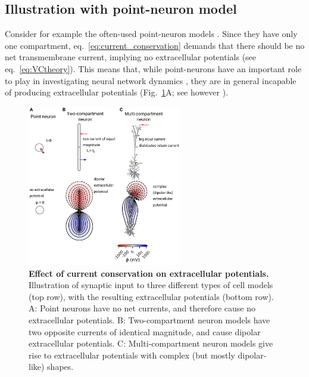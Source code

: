 \documentclass[preprint,11pt,authoryear]{elsarticle}
\begin{document}
\subsection*{Illustration with point-neuron model}
Consider for example the often-used point-neuron models \citep{Sterratt2011}. Since they have only one compartment, eq.~\ref{eq:current_conservation} demands that there should be no net transmembrane current, implying no extracellular potentials (see eq.~\ref{eq:VCtheory}). This means that, while point-neurons have an important role to play in investigating neural network dynamics \citep{Einevoll2019}, they are in general incapable of producing extracellular potentials (Fig.~\ref{fig:current_conservation}A; see however \cite{Mazzoni2015, Hagen2016}). 

\begin{figure}[h!]
\begin{center}
\includegraphics[width=0.6\textwidth]{dipoles}
\end{center}
\caption{\textbf{Effect of current conservation on extracellular potentials.} 
Illustration of synaptic input to three different types of cell models (top row), with the resulting extracellular potentials (bottom row). 
A: Point neurons have no net currents, and therefore cause no extracellular potentials. B: Two-compartment neuron models have two opposite currents
of identical magnitude, and cause dipolar extracellular potentials. C: Multi-compartment neuron models \citep{Hay2011} give rise to extracellular potentials with complex (but mostly dipolar-like) shapes.}
\label{fig:current_conservation}
\end{figure}
\end{document}
